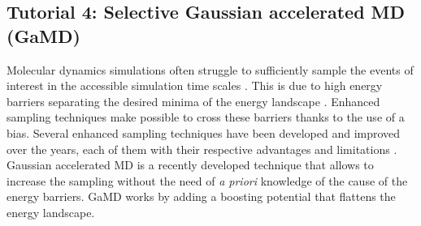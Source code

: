 
\subsection{Tutorial 4: Selective Gaussian accelerated MD (GaMD)}
Molecular dynamics simulations often struggle to sufficiently sample the events of interest in the accessible simulation time scales \cite{hansson2002molecular}.
This is due to high energy barriers separating the desired minima of the energy landscape \cite{volkhardt2022estimating}.
Enhanced sampling techniques make possible to cross these barriers thanks to the use of a bias. Several enhanced sampling techniques have been developed and improved over the years, each of them with their respective advantages and limitations \cite{yang2019enhanced}.
Gaussian accelerated MD is a recently developed technique that allows to increase the sampling without the need of \textit{a priori} knowledge of the cause of the energy barriers. GaMD works by adding a boosting potential that flattens the energy landscape.

